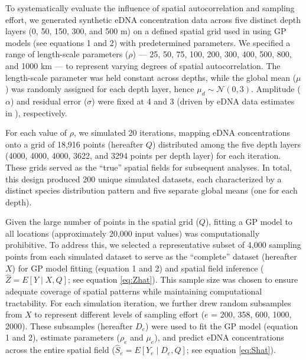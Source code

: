 \documentclass{article}
\begin{document}
To systematically evaluate the influence of spatial autocorrelation and sampling effort, we generated synthetic eDNA concentration data across five distinct depth layers (0, 50, 150, 300, and 500 m) on a defined spatial grid used in \citet[][in review]{guri2025} using GP models (see equations 1 and 2) with predetermined parameters. We specified a range of length-scale parameters ($\rho$) — 25, 50, 75, 100, 200, 300, 400, 500, 800, and 1000 km — to represent varying degrees of spatial autocorrelation. The length-scale parameter was held constant across depths, while the global mean ($\mu$) was randomly assigned for each depth layer, hence $\mu_d \sim \mathcal{N}(0,3)$. Amplitude ($\alpha$) and residual error ($\sigma$) were fixed at 4 and 3 (driven by eDNA data estimates in \citet[][in review]{guri2025}), respectively.

For each value of $\rho$, we simulated 20 iterations, mapping eDNA concentrations onto a grid of 18,916 points (hereafter $Q$) distributed among the five depth layers (4000, 4000, 4000, 3622, and 3294 points per depth layer) for each iteration. These grids served as the “true” spatial fields for subsequent analyses. In total, this design produced 200 unique simulated datasets, each characterized by a distinct species distribution pattern and five separate global means (one for each depth). 

Given the large number of points in the spatial grid ($Q$), fitting a GP model to all locations (approximately 20,000 input values) was computationally prohibitive. To address this, we selected a representative subset of 4,000 sampling points from each simulated dataset to serve as the “complete” dataset (hereafter $X$) for GP model fitting (equation 1 and 2) and spatial field inference ($\hat{Z} = E[Y \mid X, Q]$; see equation \eqref{eq:Zhat}). This sample size was chosen to ensure adequate coverage of spatial patterns while maintaining computational tractability. For each simulation iteration, we further drew random subsamples from $X$ to represent different levels of sampling effort ($e$ = 200, 358, 600, 1000, 2000). These subsamples (hereafter $D_e$) were used to fit the GP model (equation 1 and 2), estimate parameters ($\rho_e$ and $\mu_e$), and predict eDNA concentrations across the entire spatial field ($\hat{S}_e = E[Y_e \mid D_e, Q]$; see equation \eqref{eq:Shat}). 
\end{document}
